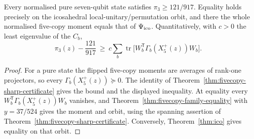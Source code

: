 \begin{corollary}
\label{cor:seven-global-from-fivecopy}
Every normalised pure seven-qubit state satisfies $\pi_3\ge121/917$.
Equality holds precisely on the icosahedral local-unitary/permutation
orbit, and there the whole normalised five-copy moment equals that of
$\Psi_{\rm ico}$. Quantitatively, with $c>0$ the least eigenvalue of the
$C_b$,
\[
 \pi_3(z)-\frac{121}{917}\ \ge\ c\sum_b\operatorname{tr}
 \bigl[W_b^{\mathsf T}\Gamma_b(X_5^+(z))W_b\bigr].
\]
\end{corollary}
\begin{proof}
For a pure state the flipped five-copy moments are averages of rank-one
projectors, so every $\Gamma_b(X_5^+(z))\succeq0$. The identity of
Theorem~\ref{thm:fivecopy-sharp-certificate} gives the bound and the
displayed inequality. At equality every
$W_b^{\mathsf T}\Gamma_b(X_5^+(z))W_b$ vanishes, and
Theorem~\ref{thm:fivecopy-family-equality} with $y=37/524$ gives the
moment and orbit, using the spanning assertion of
Theorem~\ref{thm:fivecopy-sharp-certificate}. Conversely,
Theorem~\ref{thm:ico} gives equality on that orbit.
\end{proof}

